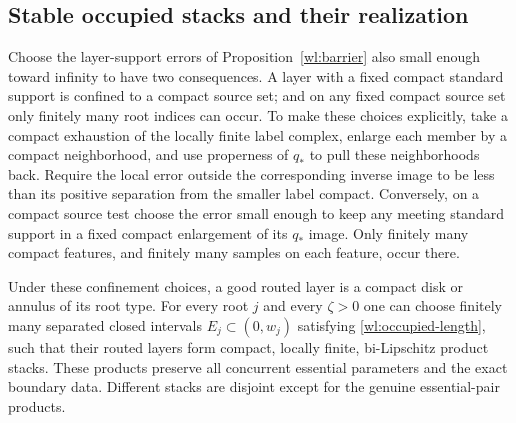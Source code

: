 \subsection{Stable occupied stacks and their realization}

Choose the layer-support errors of Proposition~\ref{wl:barrier} also
small enough toward infinity to have two consequences.  A layer
with a fixed compact standard support is confined to a compact
source set; and on any fixed compact source set only finitely many
root indices can occur.  To make these choices explicitly, take a
compact exhaustion of the locally finite label complex, enlarge
each member by a compact neighborhood, and use properness of $q_*$
to pull these neighborhoods back.  Require the local error outside
the corresponding inverse image to be less than its positive
separation from the smaller label compact.  Conversely, on a compact
source test choose the error small enough to keep any meeting
standard support in a fixed compact enlargement of its $q_*$ image.
Only finitely many compact features, and finitely many samples on
each feature, occur there.

\begin{lemma}\label{wl:stable}
Under these confinement choices, a good routed layer is a compact
disk or annulus of its root type.  For every root $j$ and every
$\zeta>0$ one can choose finitely many separated closed intervals
$E_j\subset(0,w_j)$ satisfying \eqref{wl:occupied-length}, such that
their routed layers form compact, locally finite, bi-Lipschitz
product stacks.  These products preserve all concurrent essential
parameters and the exact boundary data.  Different stacks are
disjoint except for the genuine essential-pair products.
\end{lemma}

